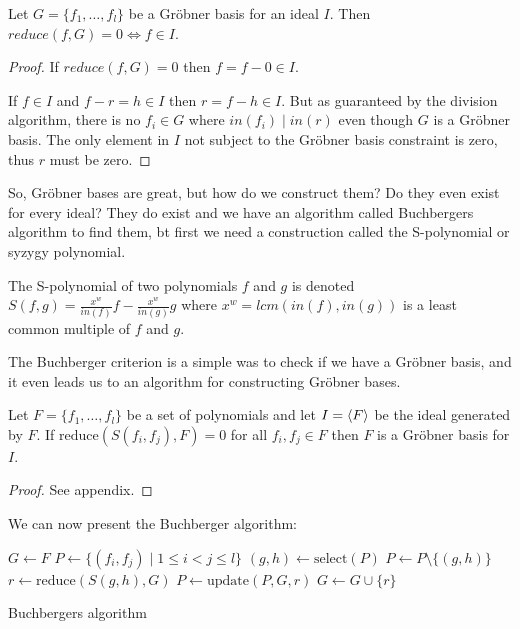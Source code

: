 \documentclass{article}
\theoremstyle{changedot}
\theoremstyle{changedotbreak}
\theoremstyle{nonumberplain}
\newtheorem{proof}{Proof}
\DeclarePairedDelimiter{\tuple}{\langle}{\rangle}
\begin{document}
\begin{theorem}
  Let $G = \{f_{1}, \dots, f_{l}\}$ be a Gröbner basis for an ideal $I$. Then $reduce(f, G) = 0 \Longleftrightarrow f \in I$.
\end{theorem}
\begin{proof}
  If $reduce(f, G) = 0$ then $f = f - 0 \in I$.

  If $f \in I$ and $f - r = h \in I$ then $r = f - h \in I$. But as guaranteed by the division algorithm, there is no $f_{i} \in G$ where $in(f_{i}) \mid in(r)$ even though $G$ is a Gröbner basis. The only element in $I$ not subject to the Gröbner basis constraint is zero, thus $r$ must be zero.
\end{proof}

So, Gröbner bases are great, but how do we construct them? Do they even exist for every ideal? They do exist and we have an algorithm called Buchbergers algorithm to find them, bt first we need a construction called the S-polynomial or syzygy polynomial.

\begin{definition}
  The S-polynomial of two polynomials $f$ and $g$ is denoted $S(f, g) = \frac{x^{w}}{in(f)} f - \frac{x^{w}}{in(g)} g$ where $x^{w} = lcm(in(f), in(g))$ is a least common multiple of $f$ and $g$.
\end{definition}

The Buchberger criterion is a simple was to check if we have a Gröbner basis, and it even leads us to an algorithm for constructing Gröbner bases.

\begin{theorem}\label{thm:buchberger_crit}
Let $F = \{f_{1}, \dots, f_{l}\}$ be a set of polynomials and let $I = \tuple F$ be the ideal generated by $F$. If $\text{reduce}(S(f_{i}, f_{j}), F) = 0$ for all $f_{i}, f_{j} \in F$ then $F$ is a Gröbner basis for $I$.
\end{theorem}
\begin{proof}
  See appendix.
\end{proof}

We can now present the Buchberger algorithm:

\begin{algorithm}[H]
\DontPrintSemicolon

  $G \leftarrow F$ \;
  $P \leftarrow \{(f_{i}, f_{j}) \mid 1 \leq i < j \leq l\}$ \;
  {
    $(g, h) \leftarrow \text{select}(P)$ \;
    $P \leftarrow P \setminus \{(g, h)\}$ \;
    $r \leftarrow \text{reduce}(S(g, h), G)$ \;
    {
      $P \leftarrow \text{update}(P, G, r)$ \;
      $G \leftarrow G \cup \{r\}$ \;
    }
  }

\caption{Buchbergers algorithm}
\end{algorithm}
\end{document}
